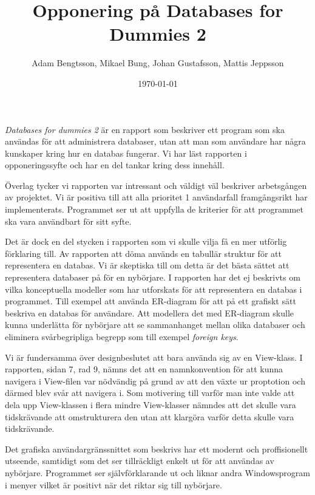 \documentclass[a4paper, 12pt]{article}
\begin{document}
    \title{Opponering på Databases for Dummies 2}
    \author{
        Adam Bengtsson, 
        Mikael Bung, 
        Johan Gustafsson, 
        Mattis Jeppsson 
    }
    \date{\today}
    \maketitle
    

\emph{Databases for dummies 2} är en rapport som beskriver ett program som ska användas för att administrera databaser, utan att man som användare har några kunskaper kring hur en databas fungerar. Vi har läst rapporten i opponeringssyfte och har en del tankar kring dess innehåll.

Överlag tycker vi rapporten var intressant och väldigt väl beskriver arbetsgången av projektet. Vi är positiva till att alla prioritet 1 användarfall framgångsrikt har implementerats. Programmet ser ut att uppfylla de kriterier för att programmet ska vara användbart för sitt syfte. 

Det är dock en del stycken i rapporten som vi skulle vilja få en mer utförlig förklaring till.
Av rapporten att döma används en tabullär struktur för att representera en databas. Vi är skeptiska till om detta är det bästa sättet att representera databaser på för en nybörjare. I rapporten har det ej beskrivts om vilka konceptuella modeller som har utforskats för att representera en databas i programmet. Till exempel att använda ER-diagram för att på ett grafiskt sätt beskriva en databas för användare. Att modellera det med ER-diagram skulle kunna underlätta för nybörjare att se sammanhanget mellan olika databaser och eliminera svårbegripliga begrepp som till exempel \emph{foreign keys}.

Vi är fundersamma över designbeslutet att bara använda sig av en View-klass. I rapporten, sidan 7, rad 9,  nämns det att en namnkonvention för att kunna navigera i View-filen var nödvändig på grund av att den växte ur proptotion och därmed blev svår att navigera i. Som motivering till varför man inte valde att dela upp View-klassen i flera mindre View-klasser nämndes att det skulle vara tidskrävande att omstrukturera den utan att klargöra varför detta skulle vara tidskrävande.  

Det grafiska användargränssnittet som beskrivs har ett modernt och proffisionellt utseende, samtidigt som det ser tillräckligt enkelt ut för att användas av nybörjare. Programmet ser självförklarande ut och liknar andra Windowsprogram i menyer vilket är positivt när det riktar sig till nybörjare. 
\end{document}
